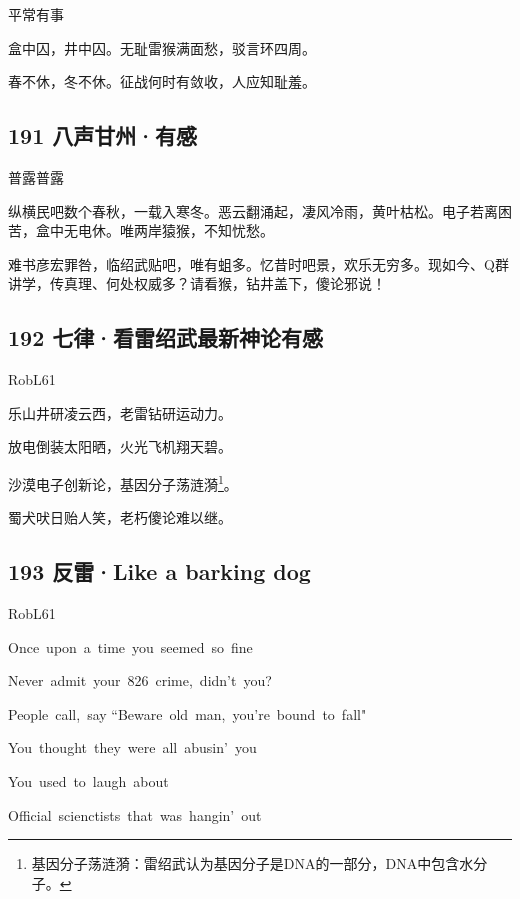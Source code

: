 平常有事

盒中囚，井中囚。无耻雷猴满面愁，驳言环四周。

春不休，冬不休。征战何时有敛收，人应知耻羞。

\hypertarget{ux516bux58f0ux7518ux5ddeux6709ux611f}{%
\subsection{191
八声甘州·有感}\label{ux516bux58f0ux7518ux5ddeux6709ux611f}}

普露普露

纵横民吧数个春秋，一载入寒冬。恶云翻涌起，凄风冷雨，黄叶枯松。电子若离困苦，盒中无电休。唯两岸猿猴，不知忧愁。

难书彦宏罪咎，临绍武贴吧，唯有蛆多。忆昔时吧景，欢乐无穷多。现如今、Q群讲学，传真理、何处权威多？请看猴，钻井盖下，傻论邪说！
~\\

\hypertarget{ux4e03ux5f8bux770bux96f7ux7ecdux6b66ux6700ux65b0ux795eux8bbaux6709ux611f}{%
\subsection{192
七律·看雷绍武最新神论有感}\label{ux4e03ux5f8bux770bux96f7ux7ecdux6b66ux6700ux65b0ux795eux8bbaux6709ux611f}}

RobL61

乐山井研凌云西，老雷钻研运动力。

放电倒装太阳晒，火光飞机翔天碧。

沙漠电子创新论，基因分子荡涟漪\footnote{基因分子荡涟漪：雷绍武认为基因分子是DNA的一部分，DNA中包含水分子。}。

蜀犬吠日贻人笑，老朽傻论难以继。

\hypertarget{ux53cdux96f7like-a-barking-dog}{%
\subsection{193 反雷·Like a barking
dog}\label{ux53cdux96f7like-a-barking-dog}}

{RobL61}

Once~upon~a~time~you~seemed~so~fine

Never~admit~your~826~crime,~didn't~you?

People~call,~say ``Beware~old~man,~you're~bound~to~fall"

You~thought~they~were~all~abusin'~you

You~used~to~laugh~about

Official~scienctists~that~was~hangin'~out

